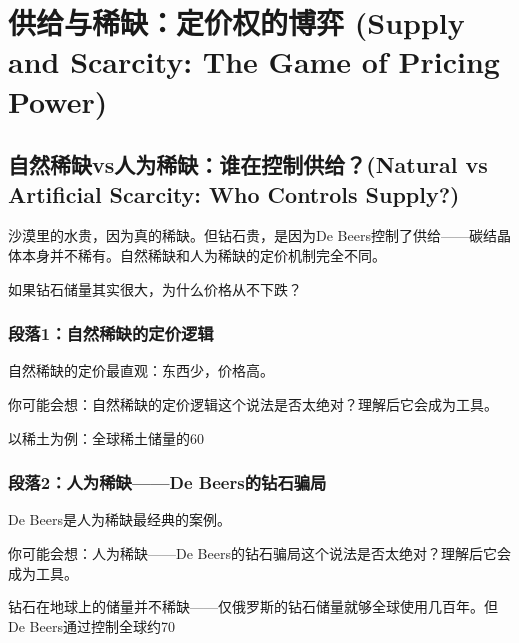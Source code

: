 \documentclass[openany, a4paper, 12pt]{book}
\newenvironment{motivation}{
	\vspace{0.5em}
	\begin{tcolorbox}[
		colback=gray!10,           %
		colframe=gray!60,          %
		title=\textit{本章动机 (Motivation)},
		fonttitle=\bfseries,
		arc=0mm,                   %
		leftrule=3mm               %
		]
		\small \itshape %
	}{
	\end{tcolorbox}
	\vspace{1em}
}
\begin{document}
	\section{供给与稀缺：定价权的博弈 (Supply and Scarcity: The Game of Pricing Power)}

	\subsection{自然稀缺vs人为稀缺：谁在控制供给？(Natural vs Artificial Scarcity: Who Controls Supply?)}
	\begin{motivation}
		沙漠里的水贵，因为真的稀缺。但钻石贵，是因为De Beers控制了供给——碳结晶体本身并不稀有。自然稀缺和人为稀缺的定价机制完全不同。
	\end{motivation}
	\begin{questionbox}
		如果钻石储量其实很大，为什么价格从不下跌？
	\end{questionbox}

	\subsubsection*{段落1：自然稀缺的定价逻辑}
	自然稀缺的定价最直观：东西少，价格高。
	\begin{tcolorbox}[colback=yellow!5, title=\textit{读者行为预测}]
		你可能会想：自然稀缺的定价逻辑这个说法是否太绝对？理解后它会成为工具。
	\end{tcolorbox}

以稀土为例：全球稀土储量的60%

	\subsubsection*{段落2：人为稀缺——De Beers的钻石骗局}
	De Beers是人为稀缺最经典的案例。
	\begin{tcolorbox}[colback=yellow!5, title=\textit{读者行为预测}]
		你可能会想：人为稀缺——De Beers的钻石骗局这个说法是否太绝对？理解后它会成为工具。
	\end{tcolorbox}

钻石在地球上的储量并不稀缺——仅俄罗斯的钻石储量就够全球使用几百年。但De Beers通过控制全球约70%
\end{document}

